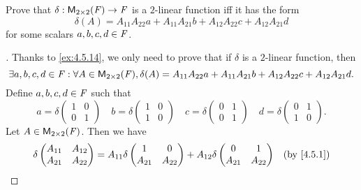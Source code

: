 \begin{ex}\label{ex:4.5.15}
  Prove that \(\delta : \mathsf{M}_{{2} \times 2}({\mathit{F}}) \to \mathit{F}\) is a \(2\)-linear function iff it has the form
  \[
    \delta(A) = A_{1 1} A_{2 2} a + A_{1 1} A_{2 1} b + A_{1 2} A_{2 2} c + A_{1 2} A_{2 1} d
  \]
  for some scalars \(a, b, c, d \in \mathit{F}\).
\end{ex}

\begin{proof}[]
  Thanks to \cref{ex:4.5.14}, we only need to prove that if \(\delta\) is a \(2\)-linear function, then
  \[
    \exists a, b, c, d \in \mathit{F} : \forall A \in \mathsf{M}_{{2} \times 2}({\mathit{F}}), \delta(A) = A_{1 1} A_{2 2} a + A_{1 1} A_{2 1} b + A_{1 2} A_{2 2} c + A_{1 2} A_{2 1} d.
  \]
  Define \(a, b, c, d \in \mathit{F}\) such that
  \[
    a = \delta\begin{pmatrix}
      1 & 0 \\
      0 & 1
    \end{pmatrix} \quad b = \delta\begin{pmatrix}
      1 & 0 \\
      1 & 0
    \end{pmatrix} \quad c = \delta\begin{pmatrix}
      0 & 1 \\
      0 & 1
    \end{pmatrix} \quad d = \delta\begin{pmatrix}
      0 & 1 \\
      1 & 0
    \end{pmatrix}.
  \]
  Let \(A \in \mathsf{M}_{{2} \times 2}({\mathit{F}})\).
  Then we have
  \begin{align*}
    \delta\begin{pmatrix}
            A_{1 1} & A_{1 2} \\
            A_{2 1} & A_{2 2}
          \end{pmatrix} & = A_{1 1} \delta\begin{pmatrix}
                                            1       & 0       \\
                                            A_{2 1} & A_{2 2}
                                          \end{pmatrix} + A_{1 2} \delta\begin{pmatrix}
                                                                          0       & 1       \\
                                                                          A_{2 1} & A_{2 2}
                                                                        \end{pmatrix}                                    &  & \text{(by \cref{4.5.1})}                 \\

\end{align*}
\end{proof}
